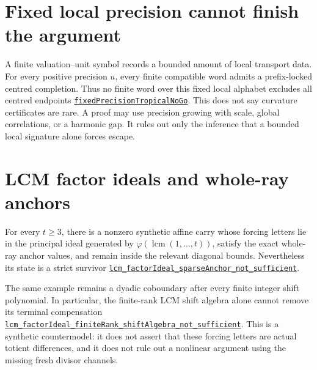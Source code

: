 \documentclass[11pt]{article}
\newcommand{\commit}{81150c1c6fdd4cd51e76d3aa0de344341e0e9e7c}
\newcommand{\repobase}{https://github.com/wcook04/plectis-lean-erdos249-257/blob/\commit}
\newcommand{\PK}{Erdos249257}
\newcommand{\lref}[3]{\href{\repobase/\PK/#1\#L#2}{\nolinkurl{#3}}}
\theoremstyle{remark}\newtheorem*{remark}{Remark}
\begin{document}
\section{Fixed local precision cannot finish the argument}\label{sec:nogo}
A finite valuation--unit symbol records a bounded amount of local transport
data.  For every positive precision $u$, every finite compatible word admits
a prefix-locked centred completion.  Thus no finite word over this fixed local
alphabet excludes all centred endpoints
\lref{TropicalCurvatureCarry.lean}{137}{fixedPrecisionTropicalNoGo}.
This does not say curvature certificates are rare.  A proof may use precision
growing with scale, global correlations, or a harmonic gap.  It rules out only
the inference that a bounded local signature alone forces escape.

\section{LCM factor ideals and whole-ray anchors}\label{sec:factorideal}
For every $t\geq 3$, there is a nonzero synthetic affine carry whose forcing
letters lie in the principal ideal generated by
$\varphi(\operatorname{lcm}(1,\ldots,t))$, satisfy the exact whole-ray anchor
values, and remain inside the relevant diagonal bounds. Nevertheless its
state is a strict survivor
\lref{LcmFactorIdealPulseObstruction.lean}{866}{lcm_factorIdeal_sparseAnchor_not_sufficient}.

The same example remains a dyadic coboundary after every finite integer shift
polynomial. In particular, the finite-rank LCM shift algebra alone cannot
remove its terminal compensation
\lref{LcmFactorIdealPulseObstruction.lean}{798}{lcm_factorIdeal_finiteRank_shiftAlgebra_not_sufficient}.
This is a synthetic countermodel: it does not assert that these forcing letters
are actual totient differences, and it does not rule out a nonlinear argument
using the missing fresh divisor channels.
\end{document}
